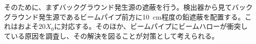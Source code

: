 そのために、まずバックグラウンド発生源の遮蔽を行う。検出器から見てバックグラウンド発生源であるビームパイプ前方に\SI{10}{cm}程度の鉛遮蔽を配置する。これはおよそ$20 X_0$に対応する。そのほか、ビームパイプにビームハローが衝突している原因を調査し、その解決を図ることが対策として考えられる。

